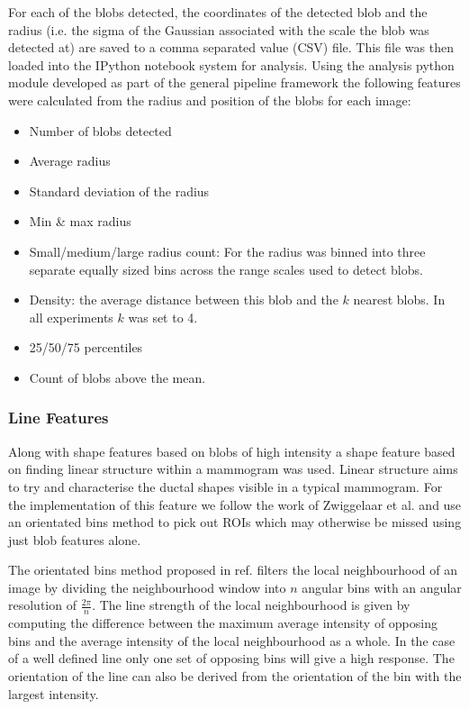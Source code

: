 For each of the blobs detected, the coordinates of the detected blob and the radius (i.e. the sigma of the Gaussian associated with the scale the blob was detected at) are saved to a comma separated value (CSV) file. This file was then loaded into the IPython notebook system for analysis. Using the analysis python module developed as part of the general pipeline framework the following features were calculated from the radius and position of the blobs for each image:

\begin{itemize}
	\item Number of blobs detected
	\item Average radius
	\item Standard deviation of the radius
	\item Min \& max radius
	\item Small/medium/large radius count: For the radius was binned into three separate equally sized bins across the range scales used to detect blobs.
	\item Density: the average distance between this blob and the $k$ nearest blobs. In all experiments $k$ was set to 4.
	\item 25/50/75 percentiles
	\item Count of blobs above the mean.
\end{itemize}


\subsubsection{Line Features}
Along with shape features based on blobs of high intensity a shape feature based on finding linear structure within a mammogram was used. Linear structure aims to try and characterise the ductal shapes visible in a typical mammogram. For the implementation of this feature we follow the work of Zwiggelaar et al. \cite{zwiggelaar1996finding} and use an orientated bins method to pick out ROIs which may otherwise be missed using just blob features alone.

The orientated bins method proposed in ref. \cite{zwiggelaar1996finding} filters the local neighbourhood of an image by dividing the neighbourhood window into $n$ angular bins with an angular resolution of $\frac{2 \pi}{n}$. The line strength of the local neighbourhood is given by computing the difference between the maximum average intensity of opposing bins and the average intensity of the local neighbourhood as a whole. In the case of a well defined line only one set of opposing bins will give a high response. The orientation of the line can also be derived from the orientation of the bin with the largest intensity. 


